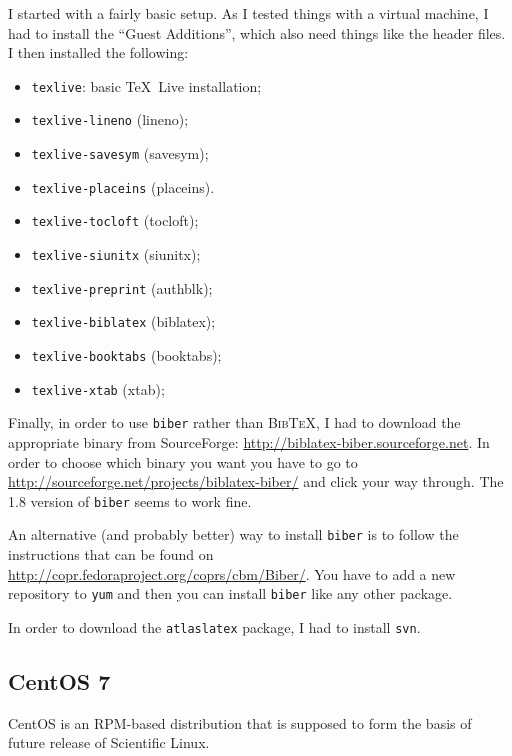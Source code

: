 \documentclass[atlasstyle,UKenglish]{latex/atlasdoc}
\newcommand{\BibTeX}{\textsc{Bib\TeX}}
\newcommand{\Package}[1]{\texttt{#1}\xspace}
\begin{document}
I started with a fairly basic setup.
As I tested things with a virtual machine, I had to install the \enquote{Guest Additions},
which also need things like the header files.
I then installed the following:
\begin{itemize}\setlength{\parskip}{0pt}\setlength{\itemsep}{0pt}
\item \Package{texlive}: basic \TeX\ Live installation;
\item \Package{texlive-lineno} (lineno);
\item \Package{texlive-savesym} (savesym);
\item \Package{texlive-placeins} (placeins).
\item \Package{texlive-tocloft} (tocloft);
\item \Package{texlive-siunitx} (siunitx);
\item \Package{texlive-preprint} (authblk);
\item \Package{texlive-biblatex} (biblatex);
\item \Package{texlive-booktabs} (booktabs);
\item \Package{texlive-xtab} (xtab);
\end{itemize}

Finally, in order to use \Package{biber} rather than \BibTeX,
I had to download the appropriate binary from SourceForge:
\url{http://biblatex-biber.sourceforge.net}.
In order to choose which binary you want you have to go to
\url{http://sourceforge.net/projects/biblatex-biber/} and click your way through.
The 1.8 version of \Package{biber} seems to work fine.

An alternative (and probably better) way to install \Package{biber} is to follow the
instructions that can be found on
\url{http://copr.fedoraproject.org/coprs/cbm/Biber/}.
You have to add a new repository to \Package{yum} and then you
can install \Package{biber} like any other package.

In order to download the \Package{atlaslatex} package, I had to install \Package{svn}.


\subsection{CentOS 7} 

CentOS is an RPM-based distribution that is supposed to form the basis of future
release of Scientific Linux.
\end{document}
